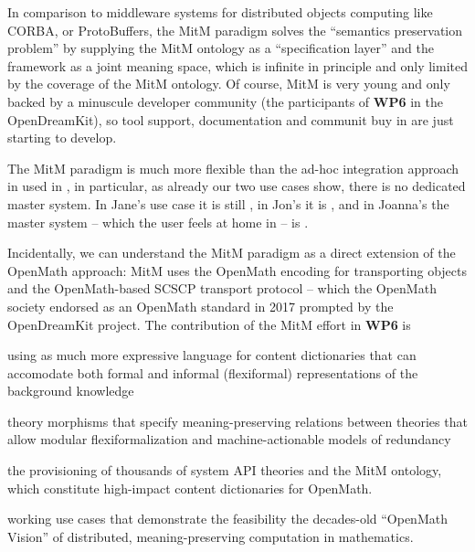 In comparison to middleware systems for distributed objects computing like CORBA, or ProtoBuffers, the MitM paradigm solves the ``semantics preservation problem'' by supplying the MitM ontology as a ``specification layer'' and the \ommt framework as a joint meaning space, which is infinite in principle and only limited by the coverage of the MitM ontology. 
Of course, MitM is very young and only backed by a minuscule developer community (the participants of \textbf{WP6} in the OpenDreamKit), so tool support, documentation and communit buy in are just starting to develop. 

The MitM paradigm is much more flexible than the ad-hoc integration approach in used in \Sage, in particular, as already our two use cases show, there is no dedicated master system. In Jane's use case it is still \SageMath, in Jon's it is \GAP, and in Joanna's the master system -- which the user feels at home in -- is \LMFDB.

Incidentally, we can understand the MitM paradigm as a direct extension of the OpenMath approach: MitM uses the OpenMath encoding for transporting objects and the OpenMath-based SCSCP transport protocol -- which the OpenMath society endorsed as an OpenMath standard in 2017 prompted by the OpenDreamKit project.
The contribution of the MitM effort in \textbf{WP6} is
\begin{compactenum}
  \item using \ommt as much more expressive language for content dictionaries that can accomodate both formal and informal (flexiformal) representations of the background knowledge
  \item \ommt theory morphisms that specify meaning-preserving relations between theories that allow modular flexiformalization and machine-actionable models of redundancy
  \item the provisioning of thousands of system API theories and the MitM ontology, which constitute high-impact content dictionaries for OpenMath. 
  \item working use cases that demonstrate the feasibility the decades-old ``OpenMath Vision'' of distributed, meaning-preserving computation in mathematics. 
\end{compactenum}

